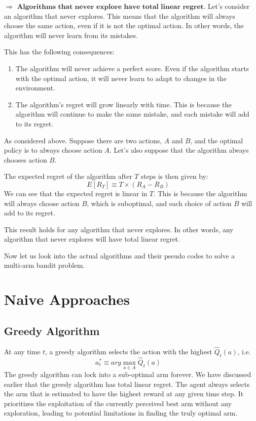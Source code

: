 \documentclass{article}
\begin{document}
$\Rightarrow$ $\textbf{Algorithms that never explore have total linear regret.}$  Let's consider an algorithm that never explores. This means that the algorithm will always choose the same action, even if it is not the optimal action. In other words, the algorithm will never learn from its mistakes.

This has the following consequences:
\begin{enumerate}
    \item The algorithm will never achieve a perfect score. Even if the algorithm starts with the optimal action, it will never learn to adapt to changes in the environment.
    \item The algorithm's regret will grow linearly with time. This is because the algorithm will continue to make the same mistake, and each mistake will add to its regret.
\end{enumerate}
As considered above. Suppose there are two actions, $A$ and $B$, and the optimal policy is to always choose action $A$. Let's also suppose that the algorithm always chooses action $B$.

The expected regret of the algorithm after $T$ steps is then given by:
\begin{equation} \label{eu_eqn}
E[R_{T}]\equiv T \times (R_{A}-R_{B})
\end{equation}
We can see that the expected regret is linear in $T$. This is because the algorithm will always choose action $B$, which is suboptimal, and each choice of action $B$ will add to its regret.

This result holds for any algorithm that never explores. In other words, any algorithm that never explores will have total linear regret.

Now let us look into the actual algorithms and their pseudo codes to solve a multi-arm bandit problem.

\section{Naive Approaches}
\subsection{Greedy Algorithm}
At any time $t$, a greedy algorithm selects the action with the highest $\hat{Q}_{t}(a)$, i.e.
\begin{equation} \label{eu_eqn}
a_{t}^{*} \equiv arg\max_{a \in A} \hat{Q}_{t}(a)
\end{equation}
The greedy algorithm can lock into a sub-optimal arm forever. We have discussed earlier that the greedy algorithm has total linear regret. The agent always selects the arm that is estimated to have the highest reward at any given time step. It prioritizes the exploitation of the currently perceived best arm without any exploration, leading to potential limitations in finding the truly optimal arm.
\end{document}
